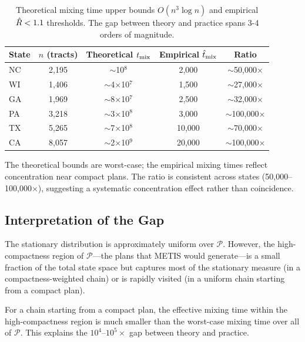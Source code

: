 \begin{table}[h]
\centering
\caption{Theoretical mixing time upper bounds $O(n^3 \log n)$ and
         empirical $\hat{R} < 1.1$ thresholds. The gap between theory and
         practice spans 3-4 orders of magnitude.}
\label{tab:mixing-bounds}
\begin{tabular}{lcccc}
\toprule
State & $n$ (tracts) & Theoretical $t_{\mathrm{mix}}$ & Empirical $\hat{t}_{\rm mix}$ & Ratio \\
\midrule
NC & 2{,}195 & $\sim$10$^8$ & 2{,}000  & $\sim$50{,}000$\times$ \\
WI & 1{,}406 & $\sim$4$\times$10$^7$ & 1{,}500  & $\sim$27{,}000$\times$ \\
GA & 1{,}969 & $\sim$8$\times$10$^7$ & 2{,}500  & $\sim$32{,}000$\times$ \\
PA & 3{,}218 & $\sim$3$\times$10$^8$ & 3{,}000  & $\sim$100{,}000$\times$ \\
TX & 5{,}265 & $\sim$7$\times$10$^8$ & 10{,}000 & $\sim$70{,}000$\times$ \\
CA & 8{,}057 & $\sim$2$\times$10$^9$ & 20{,}000 & $\sim$100{,}000$\times$ \\
\bottomrule
\end{tabular}
\end{table}

The theoretical bounds are worst-case; the empirical mixing times reflect
concentration near compact plans.
The ratio is consistent across states (50{,}000--100{,}000$\times$),
suggesting a systematic concentration effect rather than coincidence.

\subsection{Interpretation of the Gap}

The stationary distribution is approximately uniform over $\mathcal{P}$.
However, the high-compactness region of $\mathcal{P}$---the plans that
METIS would generate---is a small fraction of the total state space but
captures most of the stationary measure (in a compactness-weighted chain)
or is rapidly visited (in a uniform chain starting from a compact plan).

For a chain starting from a compact plan, the effective mixing time
within the high-compactness region is much smaller than the worst-case
mixing time over all of $\mathcal{P}$.
This explains the $10^4$--$10^5\times$ gap between theory and practice.
